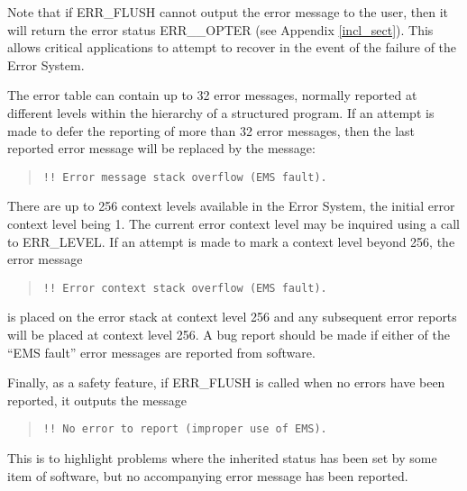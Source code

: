 Note that if ERR\_FLUSH cannot output the error message to the user, then it
will return the error status ERR\_\_OPTER (see Appendix \ref{incl_sect}).
This allows critical applications to attempt to recover in the event of the
failure of the Error System.

The error table can contain up to 32 error messages, normally reported at
different levels within the hierarchy of a structured program. 
If an attempt is made to defer the reporting of more than 32 error messages, 
then the last reported error message will be replaced by the message:

\begin{quote}
\begin {small}
\begin{verbatim}
!! Error message stack overflow (EMS fault).
\end{verbatim}
\end {small}
\end{quote}

There are up to 256 context levels available in the Error System, the 
initial error context level being 1.
The current error context level may be inquired using a call to ERR\_LEVEL.
If an attempt is made to mark a context level beyond 256, the error message

\begin{quote}
\begin {small}
\begin{verbatim}
!! Error context stack overflow (EMS fault).
\end{verbatim}
\end {small}
\end{quote}

is placed on the error stack at context level 256 and any subsequent error
reports will be placed at context level 256.
A bug report should be made if either of the ``EMS fault'' error messages are
reported from software.

Finally, as a safety feature, if ERR\_FLUSH is called when no errors have
been reported, it outputs the message 

\begin {quote}
\begin {small}
\begin{verbatim}
!! No error to report (improper use of EMS).
\end{verbatim}
\end {small}
\end {quote}

This is to highlight problems where the inherited status has been set by 
some item of software, but no accompanying error message has been reported. 


